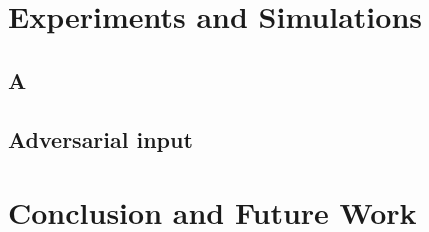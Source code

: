 \documentclass[10pt,conference,compsocconf,letterpaper]{IEEEtran}
\begin{document}
\section{Experiments and Simulations}
\subsection{A }
\subsection{Adversarial input}


\section{Conclusion and Future Work}\label{concandfuture}





%
\end{document}
